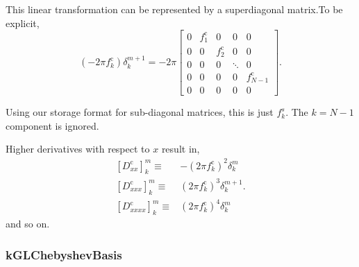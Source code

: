 \documentclass[11pt]{article}
\begin{document}
This linear transformation can be represented by a superdiagonal matrix.To be explicit,
\begin{equation}
\left( -2 \pi f_k^{\textrm{c}} \right) \delta^{m+1}_k = -2 \pi \left[\begin{array}{ccccc}0 & f_1^{\textrm{c}} & 0 & 0 & 0 \\0 & 0 & f_2^{\textrm{c}} & 0 & 0 \\0 & 0 & 0 & \ddots & 0 \\0 & 0 & 0 & 0 & f_{N-1}^{\textrm{c}} \\0 & 0 & 0 & 0 & 0\end{array}\right].
\end{equation}

Using our storage format for sub-diagonal matrices, this is just $f^s_k$. The $k=N-1$ component is ignored.

Higher derivatives with respect to $x$ result in, 
\begin{align}
\left[D_{xx}^{\textrm{c}}\right]^m_k \equiv& - \left( 2 \pi f_k^{\textrm{c}} \right)^2 \delta^{m}_k \\
\left[D_{xxx}^{\textrm{c}}\right]^m_k \equiv&  \left( 2 \pi f_k^{\textrm{c}} \right)^3 \delta^{m+1}_k. \\
\left[D_{xxxx}^{\textrm{c}}\right]^m_k \equiv& \left( 2 \pi f_k^{\textrm{c}} \right)^4 \delta^{m}_k 
\end{align}
and so on.

\subsubsection{kGLChebyshevBasis}
\end{document}
